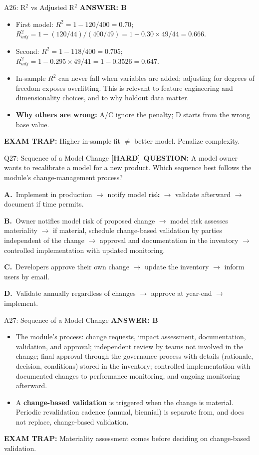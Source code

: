 \documentclass[8pt]{beamer}
\newcommand{\fs}{\fontsize{10}{12}\selectfont}
\newcommand{\opts}[4]{\par\vspace{0.12cm}\noindent\textbf{A.}~#1\par\vspace{0.08cm}\noindent\textbf{B.}~#2\par\vspace{0.08cm}\noindent\textbf{C.}~#3\par\vspace{0.08cm}\noindent\textbf{D.}~#4\par}
\newcommand{\ans}[1]{\textcolor{myblue}{\textbf{ANSWER: #1}}}
\newcommand{\trap}[1]{\textcolor{myred}{\textbf{EXAM TRAP:}} #1}
\newcommand{\hard}{\textcolor{myorange}{\textbf{[HARD]}}}
\begin{document}
\begin{frame}[t]{A26: R$^2$ vs Adjusted R$^2$}
\fs
\ans{B}
\begin{itemize}
\item First model: $R^2=1-120/400=0.70$; $R^2_{adj}=1-(120/44)/(400/49)=1-0.30\times49/44=\mathbf{0.666}$.
\item Second: $R^2=1-118/400=0.705$; $R^2_{adj}=1-0.295\times49/41=1-0.3526=\mathbf{0.647}$.
\item In-sample $R^2$ can never fall when variables are added; adjusting for degrees of freedom exposes overfitting. This is relevant to feature engineering and dimensionality choices, and to why holdout data matter.
\item \textbf{Why others are wrong:} A/C ignore the penalty; D starts from the wrong base value.
\end{itemize}
\trap{Higher in-sample fit $\ne$ better model. Penalize \textcolor{myblue}{complexity}.}
\end{frame}


\begin{frame}[t]{Q27: Sequence of a Model Change}
\fs
\hard\ \textbf{QUESTION:} A model owner wants to recalibrate a model for a new product. Which sequence best follows the module's change-management process?
\opts{Implement in production $\to$ notify model risk $\to$ validate afterward $\to$ document if time permits.}
{Owner notifies model risk of proposed change $\to$ model risk assesses materiality $\to$ if material, schedule change-based validation by parties independent of the change $\to$ approval and documentation in the inventory $\to$ controlled implementation with updated monitoring.}
{Developers approve their own change $\to$ update the inventory $\to$ inform users by email.}
{Validate annually regardless of changes $\to$ approve at year-end $\to$ implement.}
\end{frame}

\begin{frame}[t]{A27: Sequence of a Model Change}
\fs
\ans{B}
\begin{itemize}
\item The module's process: change requests, impact assessment, documentation, validation, and approval; independent review by teams not involved in the change; final approval through the governance process with details (rationale, decision, conditions) stored in the inventory; controlled implementation with documented changes to performance monitoring, and ongoing monitoring afterward.
\item A \textbf{change-based validation} is triggered when the change is material. Periodic revalidation cadence (annual, biennial) is separate from, and does not replace, change-based validation.
\end{itemize}
\trap{Materiality assessment comes \textcolor{myblue}{before} deciding on change-based validation.}
\end{frame}
\end{document}
